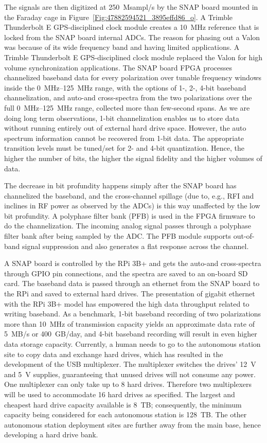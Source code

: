 The signals are then digitized at \SI{250}{Msampl/s} by the SNAP board mounted in the Faraday cage in Figure~\ref{Fig:47882594521_3895effd86_o}. A Trimble Thunderbolt E GPS-disciplined clock module creates a \SI{10}{\mega\hertz} reference that is locked from the SNAP board internal ADCs. The reason for phasing out a Valon was because of its wide frequency band and having limited applications. A Trimble Thunderbolt E GPS-disciplined clock module replaced the Valon for high volume synchronization applications. The SNAP board FPGA processes channelized baseband data for every polarization over tunable frequency windows inside the \SIrange{0}{125}{\mega\hertz} range, with the options of 1-, 2-, 4-bit baseband channelization, and auto-and cross-spectra from the two polarizations over the full \SIrange{0}{125}{\mega\hertz} range, collected more than few-second spans. As we are doing long term observations, 1-bit channelization enables us to store data without running entirely out of external hard drive space. However, the auto spectrum information cannot be recovered from 1-bit data. The appropriate transition levels must be tuned/set for 2- and 4-bit quantization. Hence, the higher the number of bits, the higher the signal fidelity and the higher volumes of data.

The decrease in bit profundity happens simply after the SNAP board has channelized the baseband, and the cross-channel spillage (due to, e.g., RFI and inclines in RF power as observed by the ADCs) is this way unaffected by the low bit profundity. A polyphase filter bank (PFB) is used in the FPGA firmware to do the channelization. The incoming analog signal passes through a polyphase filter bank after being sampled by the ADC. The PFB module supports out-of-band signal suppression and also generates a flat response across the channel.

A SNAP board is controlled by the RPi 3B+ and gets the auto-and cross-spectra through GPIO pin connections, and the spectra are saved to an on-board SD card. The baseband data is passed through an ethernet from the SNAP board to the RPi and saved to external hard drives. The presentation of gigabit ethernet with the RPi 3B+ model has empowered the high data throughput related to writing baseband. As a benchmark, 1-bit baseband recording of two polarizations more than \SI{10}{\mega\hertz} of transmission capacity yields an approximate data rate of 5~MB/s or 400~GB/day, and 4-bit baseband recording will result in even higher data storage capacity. Currently, a human needs to go to the autonomous station site to copy data and exchange hard drives, which has resulted in the development of the USB multiplexer. The multiplexer switches the drives' \SI{12}{\volt} and \SI{5}{\volt} supplies, guaranteeing that unused drives will not consume any power. One multiplexer can only take up to 8 hard drives. Therefore two multiplexers will be used to accommodate 16 hard drives as specified. The largest and cheapest hard drive capacity available is 8~TB; consequently, the minimum capacity being considered for each autonomous station is 128~TB. The other autonomous station deployment sites are further away from the main base, hence developing a hard drive bank.

